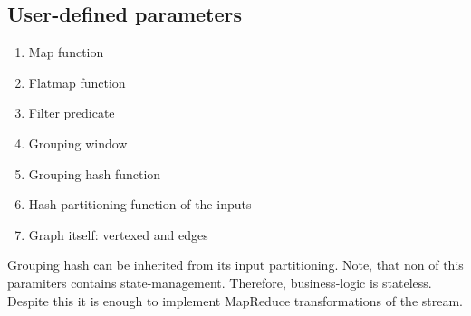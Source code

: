 \subsection{User-defined parameters}

\begin{enumerate}
  \item{Map function}
  \item{Flatmap function}
  \item{Filter predicate}
  \item{Grouping window}
  \item{Grouping hash function}
  \item{Hash-partitioning function of the inputs}
  \item{Graph itself: vertexed and edges}
\end{enumerate}

Grouping hash can be inherited from its input partitioning. Note, that non of this paramiters contains state-management. Therefore, business-logic is stateless. Despite this it is enough to implement MapReduce transformations of the stream.
